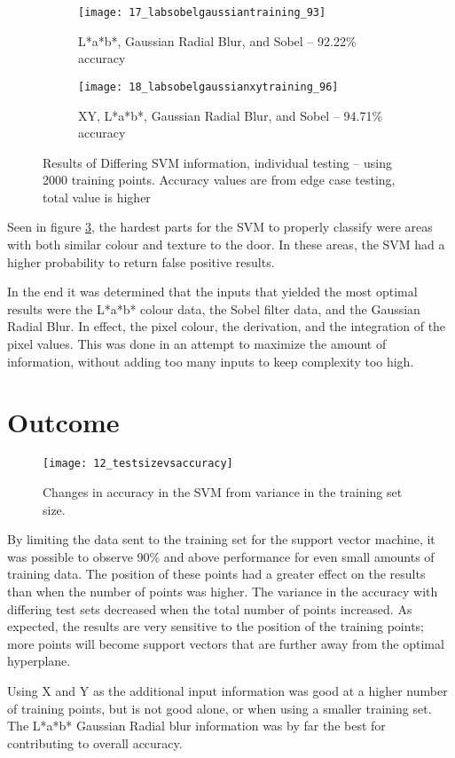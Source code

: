 \begin{figure}
\begin{subfigure}[b]{0.3\textwidth}
                \texttt{[image: 17\_labsobelgaussiantraining\_93]}
                \caption{L*a*b*, Gaussian Radial Blur, and Sobel -- 92.22\% accuracy}
                \label{fig:17_labsobelgaussiantraining_93}
        \end{subfigure}
        \begin{subfigure}[b]{0.3\textwidth}
                \centering

                \texttt{[image: 18\_labsobelgaussianxytraining\_96]}
                \caption{XY, L*a*b*, Gaussian Radial Blur, and Sobel -- 94.71\% accuracy}
                \label{fig:18_labsobelgaussianxytraining_96}
        \end{subfigure}

        \caption{Results of Differing SVM information, individual testing -- using 2000 training points. Accuracy values are from edge case testing, total value is higher}\label{fig:labResults}
\end{figure}
Seen in figure \ref{fig:labResults}, the hardest parts for the SVM to properly classify were areas with both similar colour and texture to the door. In these areas, the SVM had a higher probability to return false positive results.


In the end it was determined that the inputs that yielded the most optimal results were the L*a*b* colour data, the Sobel filter data, and the Gaussian Radial Blur. In effect, the pixel colour, the derivation, and the integration of the pixel values. This was done in an attempt to maximize the amount of information, without adding too many inputs to keep complexity too high.


\section{Outcome}

\begin{figure}[ht]
    \centering
    \texttt{[image: 12\_testsizevsaccuracy]}
    \caption{Changes in accuracy in the SVM from variance in the training set size.}
    \label{fig:12_testsizevsaccuracy}
\end{figure}

By limiting the data sent to the training set for the support vector machine, it was possible to observe 90\% and above performance for even small amounts of training data. The position of these points had a greater effect on the results than when the number of points was higher. The variance in the accuracy with differing test sets decreased when the total number of points increased. As expected, the results are very sensitive to the position of the training points; more points will become support vectors that are further away from the optimal hyperplane.

Using X and Y as the additional input information was good at a higher number of training points, but is not good alone, or when using a smaller training set. The L*a*b* Gaussian Radial blur information was by far the best for contributing to overall accuracy.

